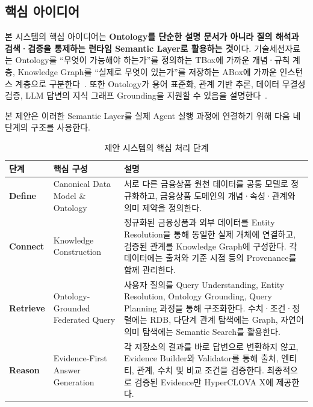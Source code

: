 \documentclass[11pt,a4paper]{article}
\begin{document}
\subsection{핵심 아이디어}

본 시스템의 핵심 아이디어는
\textbf{Ontology를 단순한 설명 문서가 아니라
질의 해석과 검색·검증을 통제하는 런타임 Semantic Layer로 활용하는 것}이다.
기술세션자료는 Ontology를 ``무엇이 가능해야 하는가''를 정의하는 TBox에 가까운 개념·규칙 계층,
Knowledge Graph를 ``실제로 무엇이 있는가''를 저장하는 ABox에 가까운 인스턴스 계층으로 구분한다~\cite[4쪽]{mirae-tech}.
또한 Ontology가 용어 표준화, 관계 기반 추론, 데이터 무결성 검증,
LLM 답변의 지식 그래프 Grounding을 지원할 수 있음을 설명한다~\cite[5쪽]{mirae-tech}.

본 제안은 이러한 Semantic Layer를 실제 Agent 실행 과정에 연결하기 위해
다음 네 단계의 구조를 사용한다.

\begin{table}[htbp]
\centering
\caption{제안 시스템의 핵심 처리 단계}
\small
\begin{tabularx}{\textwidth}{
    >{\raggedright\arraybackslash}p{}
    >{\raggedright\arraybackslash}p{}
    >{\raggedright\arraybackslash}X}
\toprule
\textbf{단계} & \textbf{핵심 구성} & \textbf{설명} \\
\midrule
\textbf{Define} &
Canonical Data Model \& Ontology &
서로 다른 금융상품 원천 데이터를 공통 모델로 정규화하고,
금융상품 도메인의 개념·속성·관계와 의미 제약을 정의한다. \\
\midrule
\textbf{Connect} &
Knowledge Construction &
정규화된 금융상품과 외부 데이터를 Entity Resolution을 통해
동일한 실제 개체에 연결하고, 검증된 관계를 Knowledge Graph에 구성한다.
각 데이터에는 출처와 기준 시점 등의 Provenance를 함께 관리한다. \\
\midrule
\textbf{Retrieve} &
Ontology-Grounded Federated Query &
사용자 질의를 Query Understanding, Entity Resolution,
Ontology Grounding, Query Planning 과정을 통해 구조화한다.
수치·조건·정렬에는 RDB, 다단계 관계 탐색에는 Graph,
자연어 의미 탐색에는 Semantic Search를 활용한다. \\
\midrule
\textbf{Reason} &
Evidence-First Answer Generation &
각 저장소의 결과를 바로 답변으로 변환하지 않고,
Evidence Builder와 Validator를 통해 출처, 엔티티, 관계,
수치 및 비교 조건을 검증한다.
최종적으로 검증된 Evidence만 HyperCLOVA X에 제공한다. \\
\bottomrule
\end{tabularx}
\end{table}
\end{document}
